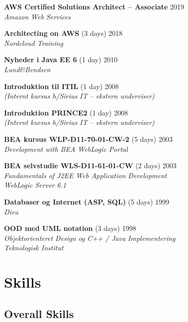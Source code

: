 \documentclass[a4paper,11pt]{article}
\begin{document}
\textbf{AWS Certified Solutions Architect -- Associate} \hfill 2019 \\
\textsl{Amazon Web Services}

\textbf{Architecting on AWS} \hfill (3 days) 2018 \\
\textsl{Nordcloud Training}

\textbf{Nyheder i Java EE 6} \hfill (1 day) 2010 \\
\textsl{Lund\&Bendsen}

\textbf{Introduktion til ITIL} \hfill (1 day) 2008 \\
\textsl{(Internt kursus h/Sirius IT -- ekstern underviser)}

\textbf{Introduktion PRINCE2} \hfill (1 day) 2008 \\
\textsl{(Internt kursus h/Sirius IT -- ekstern underviser)}

\textbf{BEA kursus WLP-D11-70-01-CW-2} \hfill (5 days) 2003 \\
\textsl{Development with BEA WebLogic Portal}

\textbf{BEA selvstudie WLS-D11-61-01-CW} \hfill (2 days) 2003 \\
\textsl{Fundamentals of J2EE Web Application Development\\WebLogic Server 6.1}


\textbf{Databaser og Internet (ASP, SQL)} \hfill (5 days) 1999 \\
\textsl{Dieu}

\textbf{OOD med UML notation} \hfill (3 days) 1998 \\
\textsl{Objektorienteret Design og C++ / Java Implementering\\Teknologisk Institut}


\section*{Skills}

\subsection*{Overall Skills}
\end{document}
